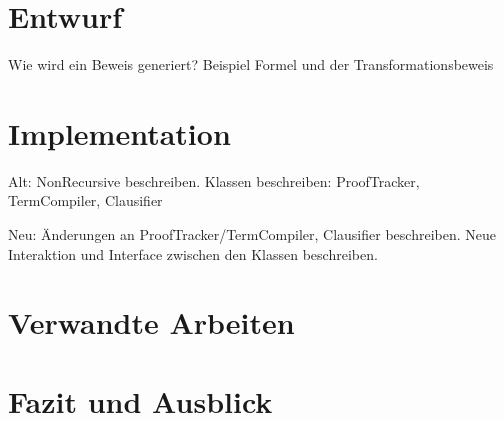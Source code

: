 \documentclass[a4paper]{article}
\begin{document}
\section{Entwurf}

Wie wird ein Beweis generiert?
Beispiel Formel und der Transformationsbeweis

\section{Implementation}

Alt:
NonRecursive beschreiben.
Klassen beschreiben: ProofTracker, TermCompiler, Clausifier

Neu:
Änderungen an ProofTracker/TermCompiler, Clausifier beschreiben.
Neue Interaktion und Interface zwischen den Klassen beschreiben.


\section{Verwandte Arbeiten}

\section{Fazit und Ausblick}


\end{document}
